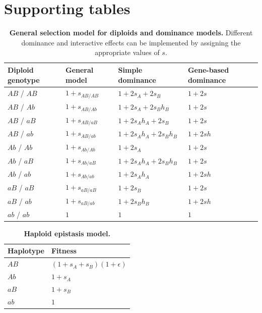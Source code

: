 \documentclass[]{article}
\begin{document}



\clearpage
\newpage

\section{Supporting tables}

\begin{table}[ht!]
    \centering
    \begin{tabular}{llll}
        \toprule
        Diploid genotype & General model & Simple dominance & Gene-based dominance\\
        \midrule
        $AB$ / $AB$ & $1 + s_{AB/AB}$ & $1 + 2s_A + 2s_B$ & $1 + 2s$\\
        $AB$ / $Ab$ & $1 + s_{AB/Ab}$ & $1 + 2s_A + 2s_Bh_B$ & $1 + 2s$\\
        $AB$ / $aB$ & $1 + s_{AB/aB}$ & $1 + 2s_Ah_A + 2s_B$ & $1 + 2s$\\
        $AB$ / $ab$ & $1 + s_{AB/ab}$ & $1 + 2s_Ah_A + 2s_Bh_B$ & $1 + 2sh$\\
        $Ab$ / $Ab$ & $1 + s_{Ab/Ab}$ & $1 + 2s_A$ & $1 + 2s$\\
        \addlinespace
        $Ab$ / $aB$ & $1 + s_{Ab/aB}$ & $1 + 2s_Ah_A + 2s_Bh_B$ & $1 + 2s$\\
        $Ab$ / $ab$ & $1 + s_{Ab/ab}$ & $1 + 2s_Ah_A$ & $1 + 2sh$\\
        $aB$ / $aB$ & $1 + s_{aB/aB}$ & $1 + 2s_B$ & $1 + 2s$\\
        $aB$ / $ab$ & $1 + s_{aB/ab}$ & $1 + 2s_Bh_B$ & $1 + 2sh$\\
        $ab$ / $ab$ & $1$ & $1$ & $1$\\
        \bottomrule
    \end{tabular}
    \caption{
        \textbf{General selection model for diploids and dominance models.}
        Different dominance and interactive effects can be implemented by
        assigning the appropriate values of $s$.
    }
    \label{tab:selmodels}
\end{table}


\begin{table}[ht!]
    \centering
    \begin{tabular}{ll}
        \toprule
        Haplotype & Fitness\\
        \midrule
        $AB$ & $(1 + s_A + s_B)(1+\epsilon)$\\
        $Ab$ & $1 + s_A$\\
        $aB$ & $1 + s_B$\\
        $ab$ & $1$\\
        \bottomrule
    \end{tabular}
    \caption{\textbf{Haploid epistasis model.}}
    \label{tab:epistasis}
\end{table}
\end{document}
